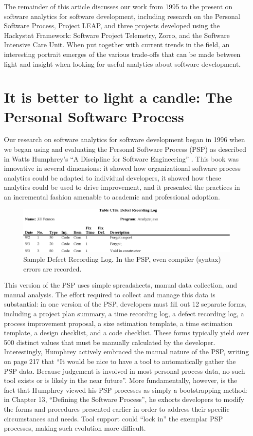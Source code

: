 \documentclass[]{article}
\begin{document}
The remainder of this article discusses our work from 1995 to the present on software
analytics for software development, including research on the Personal Software Process,
Project LEAP, and three projects developed using the Hackystat Framework: Software Project
Telemetry, Zorro, and the Software Intensive Care Unit.  When put together with current
trends in the field, an interesting portrait emerges of the various trade-offs that can be
made between light and insight when looking for useful analytics about
software development.

\section{It is better to light a candle: The Personal Software Process}

Our research on software analytics for software development began in 1996 when we began
using and evaluating the Personal Software Process (PSP) as described in Watts Humphrey's
``A Discipline for Software Engineering'' \cite{Humphrey95}. This book was innovative in
several dimensions: it showed how organizational software process analytics could be
adapted to individual developers, it showed how these analytics could be used to drive
improvement, and it presented the practices in an incremental fashion amenable to
academic and professional adoption. 

\begin{figure}[!tb]
\centering
\includegraphics[width=0.95\columnwidth]{defects.eps}
\caption{Sample Defect Recording Log. In the PSP, even compiler (syntax) errors are recorded.}
\label{fig:defect-log}
\end{figure}
 
This version of the PSP uses simple spreadsheets, manual data collection, and manual
analysis. The effort required to collect and manage this data is substantial: in one
version of the PSP, developers must fill out 12 separate forms, including a project plan
summary, a time recording log, a defect recording log, a process improvement proposal, a
size estimation template, a time estimation template, a design checklist, and a code
checklist. These forms typically yield over 500 distinct values that must be manually
calculated by the developer.  Interestingly, Humphrey actively embraced the manual nature
of the PSP, writing on page 217 that ``It would be nice to have a tool to automatically
gather the PSP data. Because judgement is involved in most personal process data, no such
tool exists or is likely in the near future''.  More fundamentally, however, is the fact
that Humphrey viewed his PSP processes as simply a bootstrapping method: in Chapter 13,
``Defining the Software Process'', he exhorts developers to modify the forms and
procedures presented earlier in order to address their specific circumstances and
needs. Tool support could ``lock in'' the exemplar PSP processes, making such evolution
more difficult.
\end{document}
